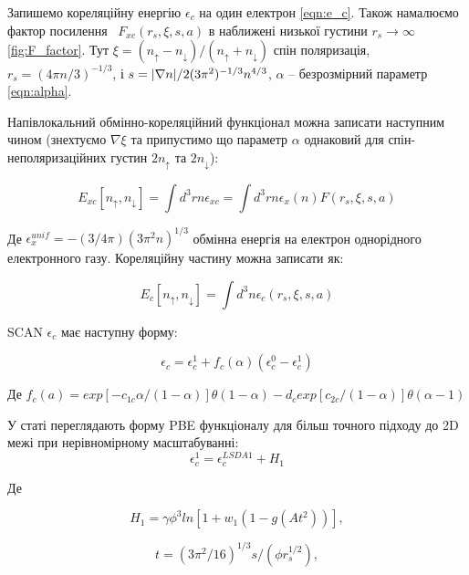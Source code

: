 Запишемо кореляційну енергію $\epsilon_c$ на один електрон \ref{eqn:e_c}. Також намалюємо фактор посилення \ $F_{xc}(r_s, \xi, s, a)$ в наближені низької густини $r_s \rightarrow \infty$ \ref{fig:F_factor}. Тут $\xi = (n_\uparrow - n_\downarrow)/(n_\uparrow + n_\downarrow)$ спін поляризація, $r_s = (4 \pi n/3)^{-1/3}$, і $s = {|\nabla{n}|}/{2(3\pi^2)^{-1/3}
\\ n^{4/3}}$, $\alpha$ -- безрозмірний параметр \ref{eqn:alpha}. 

Напівлокальний обмінно-кореляційний функціонал можна записати наступним чином (знехтуємо $\nabla \xi$ та припустимо що параметр $\alpha$ однаковий для спін-неполяризаційних густин $2n_\uparrow$ та $2n_\downarrow$):

\begin{equation}
	\label{eqn:semilocalexc}
	E_{xc}[n_{\uparrow},n_{\downarrow}] = \int{d^3 r n\epsilon_{xc} = \int d^3 r n \epsilon_{x}(n)F(r_s,\xi, s, a)}
\end{equation}

Де $\epsilon_x^{unif} = -(3/4\pi)(3\pi^2n)^{1/3}$ обмінна енергія на електрон однорідного електронного газу.  
Кореляційну частину можна записати як: 

\begin{equation}
	\label{eqn:cor}
	E_{c}[n_{\uparrow},n_{\downarrow}] = \int{d^3 n \epsilon_c (r_s,\xi, s, a)}
\end{equation}

SCAN $\epsilon_c$ має наступну форму:

\begin{equation}
	\label{eqn:e_c}
	\epsilon_c = \epsilon_c^1 + f_c(\alpha)(\epsilon_c^0 -\epsilon_c^1)
\end{equation}

Де $f_c(a) = exp[-c_{1c}\alpha/(1-\alpha)]\theta(1-\alpha)-d_c exp[c_{2c}/(1-\alpha)]\theta(\alpha-1)$

У статі \cite{SCAN} переглядають форму PBE функціоналу для більш точного підходу до 2D межі при нерівномірному масштабуванні: 
\begin{equation}
	\epsilon_c^1 = \epsilon_c^{LSDA1}+H_1
\end{equation}

Де

\begin{equation}
	\label{eqn:H_1}
	H_1 = \gamma\phi^3ln[1+w_1(1-g(At^2))],
\end{equation}

\begin{equation}
	t = (3\pi^2/16)^{1/3}s/(\phi r_s^{1/2}),
\end{equation}

